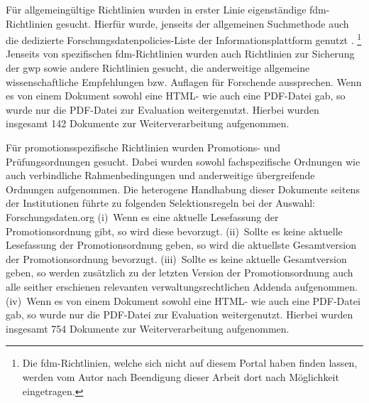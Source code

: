 Für allgemeingültige Richtlinien wurden in erster Linie eigenständige \gls{fdm}-Richtlinien gesucht.
Hierfür wurde, jenseits der allgemeinen Suchmethode auch die dedizierte Forschungsdatenpolicies-Liste der Informationsplattform \citeauthor{Forschungsdaten2024} genutzt \autocite{Forschungsdaten2024}.%
\footnote{%
    Die \gls{fdm}-Richtlinien, welche sich nicht auf diesem Portal haben finden lassen, werden vom Autor nach Beendigung dieser Arbeit dort nach Möglichkeit eingetragen.%
}
Jenseits von spezifischen \gls{fdm}-Richtlinien wurden auch Richtlinien zur Sicherung der \gls{gwp} sowie andere Richtlinien gesucht, die anderweitige allgemeine wissenschaftliche Empfehlungen bzw. Auflagen für Forschende aussprechen.
Wenn es von einem Dokument sowohl eine HTML- wie auch eine PDF-Datei gab, so wurde nur die PDF-Datei zur Evaluation weitergenutzt.
Hierbei wurden insgesamt \num{142} Dokumente zur Weiterverarbeitung aufgenommen.

Für promotionsspezifische Richtlinien wurden Promotions- und Prüfungsordnungen gesucht.
Dabei wurden sowohl fachspezifische Ordnungen wie auch verbindliche Rahmenbedingungen und anderweitige übergreifende Ordnungen aufgenommen.
Die heterogene Handhabung dieser Dokumente seitens der Institutionen führte zu folgenden Selektionsregeln bei der Auswahl:
Forschungsdaten.org
(i)~Wenn es eine aktuelle Lesefassung der Promotionsordnung gibt, so wird diese bevorzugt.
(ii)~Sollte es keine aktuelle Lesefassung der Promotionsordnung geben, so wird die aktuellste Gesamtversion der Promotionsordnung bevorzugt.
(iii)~Sollte es keine aktuelle Gesamtversion geben, so werden zusätzlich zu der letzten Version der Promotionsordnung auch alle seither erschienen relevanten verwaltungsrechtlichen Addenda aufgenommen.
(iv)~Wenn es von einem Dokument sowohl eine HTML- wie auch eine PDF-Datei gab, so wurde nur die PDF-Datei zur Evaluation weitergenutzt.
Hierbei wurden insgesamt \num{754} Dokumente zur Weiterverarbeitung aufgenommen.

